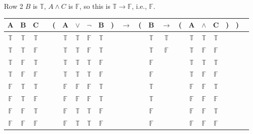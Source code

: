 \documentclass[
  ignorenonframetext,
]{beamer}
\renewcommand{\,}{\text{, }}
\def\True{\mathbb{T}}
\def\False{\mathbb{F}}
\begin{document}
\begin{frame}{Row 2}
\protect\hypertarget{row-2}{}
\(B\) is \(\True\), \(A \wedge C\) is \(\False\), so this is
\(\True \rightarrow \False\), i.e., \(\False\).

\begin{center}

\begin{tabular}{@{ }c@{ }@{ }c@{ }@{ }c | c@{ }@{}c@{}@{ }c@{ }@{ }c@{ }@{ }c@{ }@{ }c@{ }@{}c@{}@{ }c@{ }@{}c@{}@{ }c@{ }@{ }c@{ }@{}c@{}@{ }c@{ }@{ }c@{ }@{ }c@{ }@{}c@{}@{}c@{}@{ }c}
A & B & C &  & ( & A & $\vee$ & $\neg$ & B & ) & $\rightarrow$ & ( & B & $\rightarrow$ & ( & A & $\wedge$ & C & ) & ) & \\
\hline 
 $\True$ & $\True$ & $\True$ &  &  & $\True$ & $\True$ & $\False$ & $\True$ &  &&  & $\True$ & $\True$ &  & $\True$ & $\True$ & $\True$ &  &  & \\
 $\True$ & $\True$ & $\False$ &  &  & $\True$ & $\True$ & $\False$ & $\True$ &  &&  & $\True$ & $\False$ &  & $\True$ & $\False$ & $\False$ &  &  & \\
 $\True$ & $\False$ & $\True$ &  &  & $\True$ & $\True$ & $\True$ & $\False$ &  &&  & $\False$ &&  & $\True$ & $\True$ & $\True$ &  &  & \\
 $\True$ & $\False$ & $\False$ &  &  & $\True$ & $\True$ & $\True$ & $\False$ &  &&  & $\False$ &&  & $\True$ & $\False$ & $\False$ &  &  & \\
 $\False$ & $\True$ & $\True$ &  &  & $\False$ & $\False$ & $\False$ & $\True$ &  &&  & $\True$ &&  & $\False$ & $\False$ & $\True$ &  &  & \\
 $\False$ & $\True$ & $\False$ &  &  & $\False$ & $\False$ & $\False$ & $\True$ &  &&  & $\True$ &&  & $\False$ & $\False$ & $\False$ &  &  & \\
 $\False$ & $\False$ & $\True$ &  &  & $\False$ & $\True$ & $\True$ & $\False$ &  &&  & $\False$ &&  & $\False$ & $\False$ & $\True$ &  &  & \\
 $\False$ & $\False$ & $\False$ &  &  & $\False$ & $\True$ & $\True$ & $\False$ &  &&  & $\False$ &&  & $\False$ & $\False$ & $\False$ &  &  & \\
\end{tabular}

\end{center}
\end{frame}
\end{document}
